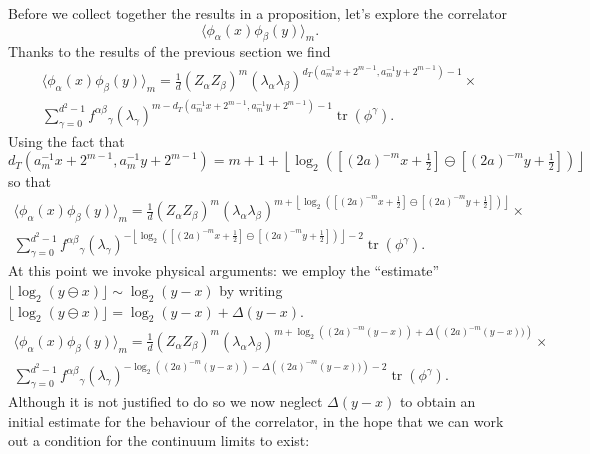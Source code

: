 \documentclass[11pt,oneside]{amsart}
\DeclareMathOperator{\tr}{tr}
\theoremstyle{plain}%
\theoremstyle{definition}
\theoremstyle{remark}
\begin{document}
Before we collect together the results in a proposition, let's explore the correlator
\begin{equation}
	\langle \phi_\alpha (x)\phi_\beta (y)\rangle_m.
\end{equation}
Thanks to the results of the previous section we find
\begin{multline}
	\langle \phi_\alpha (x)\phi_\beta (y)\rangle_m = \frac1d (Z_\alpha Z_\beta)^m(\lambda_\alpha\lambda_\beta)^{d_T(a_m^{-1} x + 2^{m-1},a_m^{-1} y + 2^{m-1})-1} \times \\ \sum_{\gamma = 0}^{d^2-1} {f^{\alpha\beta}}_\gamma (\lambda_{\gamma})^{m-d_T(a_m^{-1} x + 2^{m-1},a_m^{-1} y + 2^{m-1})-1} \tr(\phi^\gamma).
\end{multline}
Using the fact that
\begin{equation}
	d_T(a_m^{-1} x + 2^{m-1},a_m^{-1} y + 2^{m-1}) = m+1+\left\lfloor \log_2 \left( [(2a)^{-m}x + \tfrac12]\ominus[(2a)^{-m}y + \tfrac12] \right) \right\rfloor
\end{equation}
so that
\begin{multline}
	\langle \phi_\alpha (x)\phi_\beta (y)\rangle_m = \frac1d (Z_\alpha Z_\beta)^m(\lambda_\alpha\lambda_\beta)^{m+\left\lfloor \log_2 \left( [(2a)^{-m}x + \frac12]\ominus[(2a)^{-m}y + \frac12] \right) \right\rfloor} \times \\ \sum_{\gamma = 0}^{d^2-1} {f^{\alpha\beta}}_\gamma (\lambda_{\gamma})^{-\left\lfloor \log_2 \left( [(2a)^{-m}x + \frac12]\ominus[(2a)^{-m}y + \frac12] \right) \right\rfloor-2} \tr(\phi^\gamma).
\end{multline}
At this point we invoke physical arguments: we employ the ``estimate'' $\lfloor\log_2(y\ominus x)\rfloor \sim \log_2(y-x)$ by writing $\lfloor\log_2(y\ominus x)\rfloor=\log_2(y-x) + \Delta(y-x)$.
\begin{multline}
	\langle \phi_\alpha (x)\phi_\beta (y)\rangle_m = \frac1d (Z_\alpha Z_\beta)^m(\lambda_\alpha\lambda_\beta)^{m+ \log_2 \left( (2a)^{-m}(y-x)\right) + \Delta\left((2a)^{-m}(y-x))\right) } \times \\ \sum_{\gamma = 0}^{d^2-1} {f^{\alpha\beta}}_\gamma (\lambda_{\gamma})^{-\log_2 \left( (2a)^{-m}(y-x)\right) -\Delta\left((2a)^{-m}(y-x))\right)-2} \tr(\phi^\gamma).
\end{multline}
Although it is not justified to do so we now neglect $\Delta(y-x)$ to obtain an initial estimate for the behaviour of the correlator, in the hope that we can work out a condition for the continuum limits to exist:
\end{document}
